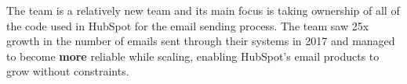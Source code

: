 The \team{} team is a relatively new team and its main focus is taking ownership of all of the code used in HubSpot for the email sending process. The team saw 25x growth in the number of emails sent through their systems in 2017 and managed to become \textbf{more} reliable while scaling, enabling HubSpot's email products to grow without constraints.  